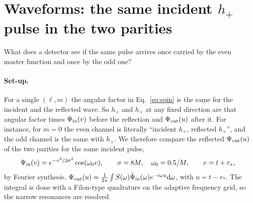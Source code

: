 \section{Waveforms: the same incident $h_+$ pulse in the two parities}\label{sec:time}
\begin{question}
What does a detector see if the same pulse arrives once carried by the even master function and once by the odd one?
\end{question}
\paragraph{Set-up.} For a single $(\ell,m)$ the angular factor in Eq.~\eqref{eq:spin} is the same for the incident and the
reflected wave. So $h_+$ and $h_\times$ at any fixed direction are that angular factor times $\Psi_{\rm in}(v)$ before the
reflection and $\Psi_{\rm out}(u)$ after it. For instance, for $m=0$ the even channel is literally ``incident $h_+$, reflected
$h_+$'', and the odd channel is the same with $h_\times$. We therefore compare the reflected $\Psi_{\rm out}(u)$ of the two
parities for the same incident pulse,
\begin{equation}
\Psi_{\rm in}(v)=e^{-v^2/2\sigma^2}\cos(\omega_0v),\qquad \sigma=8M,\quad \omega_0=0.5/M,\qquad v=t+r_* ,
\end{equation}
by Fourier synthesis, $\Psi_{\rm out}(u)=\frac1{2\pi}\int S(\omega)\tilde\Psi_{\rm in}(\omega)e^{-i\omega u}\mathrm{d}\omega$, with $u=t-r_*$. The
integral is done with a Filon-type quadrature on the adaptive frequency grid, so the narrow resonances are resolved.

